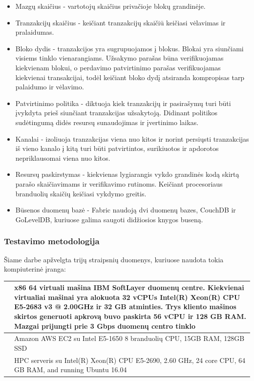 \documentclass{VUMIFPSkursinis}
\begin{document}
			\begin{itemize}
				\item{Mazgų skaičius - vartotojų skaičius privačioje blokų grandinėje.}
				\item{Tranzakcijų skaičius - keičiant tranzakcijų skaičiū keičiasi vėlavimas ir pralaidumas.}
				\item{Bloko dydis - tranzakcijos yra sugrupuojamos į blokus. Blokai yra siunčiami visiems tinklo vienarangiams. Užsakymo parašas 
būna verifikuojamas kiekvienam blokui, o perdavimo patvirtinimo parašas verifikuojamas kiekvienai transakcijai, todėl keičiant bloko dydį atsiranda kompropisas tarp palaidumo ir vėlavimo.}
				\item{Patvirtinimo politika - diktuoja kiek tranzakcijų ir pasirašymų turi būti įvykdyta prieš siunčiant tranzakcijas užsakytoją. Didinant politikos sudėtingumą didės resursų sunaudojimas ir įvertinimo laikas.}
				\item{Kanalai - izoliuoja tranzakcijas viena nuo kitos ir norint persiųsti tranzakcijas iš vieno kanalo į kitą turi būti patvirtintos, surikiuotos ir apdorotos nepriklausomai viena nuo kitos.}
				\item{Resursų paskirstymas - kiekvienas lygiarangis vykdo grandinės kodą skirtą parašo skaičiavimams ir verifikavimo rutinoms. Keičiant procesoriaus branduolių skaičių keičiasi vykdymo greitis.}
				\item{Būsenos duomenų bazė - Fabric naudoją dvi duomenų bazes, CouchDB ir GoLevelDB, kuriuose galima saugoti didžiosios knygos buseną.}
			\end{itemize}
		\subsubsection{Testavimo metodologija}
			Šiame darbe apžvelgta trijų straipsnių duomenys, kuriuose naudota tokia kompiuterinė įranga:
			\begin{center}
				\begin{tabular}{ | m{5em} | m{10cm}| } 
					\hline
					\cite{IMBResearch}& x86 64 virtuali mašina IBM SoftLayer duomenų centre. 
					Kiekvienai virtualiai mašinai yra alokuota 32 vCPUs  Intel(R) Xeon(R)
					CPU E5-2683 v3 @ 2.00GHz ir 32 GB atminties. Trys kliento mašinos skirtos generuoti apkrovą buvo paskirta
					 56 vCPU ir 128 GB RAM. Mazgai prijungti prie 3 Gbps duomenų centro tinklo  \\ 
					\hline
					 \cite{ThailandPerf}& Amazon AWS EC2
					 su Intel E5-1650 8 branduolių CPU,
					15GB RAM, 128GB SSD  \\ 
					\hline
					 \cite{ShaFabPerf}& HPC serveris
					su Intel(R) Xeon(R) CPU E5-2690, 2.60 GHz, 24 core
					CPU, 64 GB RAM, and running Ubuntu 16.04  \\ 
					\hline
				\end{tabular}
			\end{center}
\end{document}
